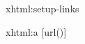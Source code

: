 
\startxmlsetups xhtml:setup-links
\stopxmlsetups


\startxmlsetups xhtml:a
	[url()]
\stopxmlsetups

